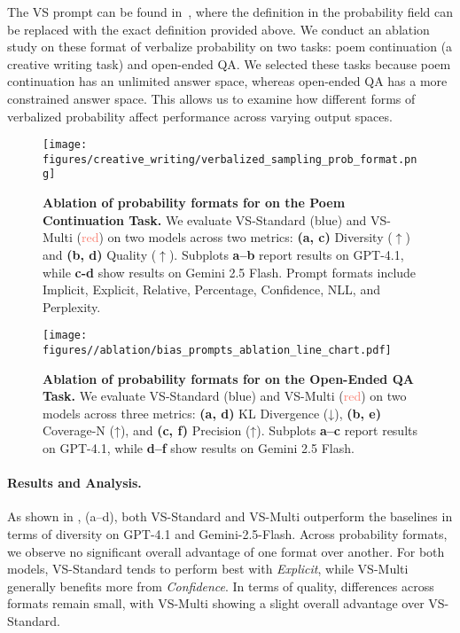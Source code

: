 The VS prompt can be found in~, where the definition in the probability field can be replaced with the exact definition provided above. We conduct an ablation study on these format of verbalize probability on two tasks: poem continuation (a creative writing task) and open-ended QA. We selected these tasks because poem continuation has an unlimited answer space, whereas open-ended QA has a more constrained answer space. This allows us to examine how different forms of verbalized probability affect performance across varying output spaces.

\begin{figure}[h]
    \centering
    \texttt{[image: figures/creative\_writing/verbalized\_sampling\_prob\_format.png]}
    \caption{\textbf{Ablation of probability formats for \ours on the Poem Continuation Task.} We evaluate VS-Standard (\textcolor{ProcessBlue}{blue}) and VS-Multi (\textcolor{Salmon}{red}) on two models across two metrics: \textbf{(a, c)} Diversity ($\uparrow$) and \textbf{(b, d)} Quality ($\uparrow$). Subplots \textbf{a–b} report results on GPT-4.1, while \textbf{c-d} show results on Gemini 2.5 Flash. Prompt formats include Implicit, Explicit, Relative, Percentage, Confidence, NLL, and Perplexity. 
    }
    \label{fig:ablation_poem_probability_prompts}
\end{figure}

\begin{figure}[h]
    \centering
    \texttt{[image: figures//ablation/bias\_prompts\_ablation\_line\_chart.pdf]}
    \caption{\textbf{Ablation of probability formats for \ours on the Open-Ended QA Task.} We evaluate VS-Standard (\textcolor{ProcessBlue}{blue}) and VS-Multi (\textcolor{Salmon}{red}) on two models across three metrics: \textbf{(a, d)} KL Divergence (↓), \textbf{(b, e)} Coverage-N (↑), and \textbf{(c, f)} Precision (↑). Subplots \textbf{a–c} report results on GPT-4.1, while \textbf{d–f} show results on Gemini 2.5 Flash.
    }
    \label{fig:ablation_bias_probability_prompts}
\end{figure}

\paragraph{Results and Analysis.} 
As shown in ,
(a–d), both VS-Standard and VS-Multi outperform the baselines in terms of diversity on GPT-4.1 and Gemini-2.5-Flash. Across probability formats, we observe no significant overall advantage of one format over another. For both models, VS-Standard tends to perform best with \textit{Explicit}, while VS-Multi generally benefits more from \textit{Confidence}. In terms of quality, differences across formats remain small, with VS-Multi showing a slight overall advantage over VS-Standard.  

